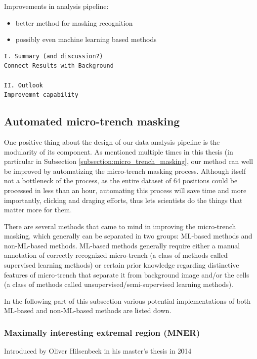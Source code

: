 \documentclass[pdftex,12pt,a4paper]{report}
\begin{document}
Improvements in analysis pipeline:

\begin{itemize}
\item better method for masking recognition
\item possibly even machine learning based methods
\end{itemize}

\begin{verbatim}
I. Summary (and discussion?)
Connect Results with Background

II. Outlook
Improvemnt capability
\end{verbatim}

\subsection{Automated micro-trench masking}

One positive thing about the design of our data analysis pipeline is the modularity of its component. As mentioned multiple times in this thesis (in particular in Subsection \ref{subsection:micro_trench_masking}, our method can well be improved by automatizing the micro-trench masking process. Although itself not a bottleneck of the process, as the entire dataset of 64 positions could be processed in less than an hour, automating this process will save time and more importantly, clicking and draging efforts, thus lets scientists do the things that matter more for them.

There are several methods that came to mind in improving the micro-trench masking, which generally can be separated in two groups: ML-based methods and non-ML-based methods. ML-based methods generally require either a manual annotation of correctly recognized micro-trench (a class of methods called supervised learning methods) or certain prior knowledge regarding distinctive features of micro-trench that separate it from background image and/or the cells (a class of methods called unsupervised/semi-supervised learning methods).

In the following part of this subsection various potential implementations of both ML-based and non-ML-based methods are listed down.

\subsubsection*{Maximally interesting extremal region (MNER)}

Introduced by Oliver Hilsenbeck in his master's thesis in 2014 \cite{hilsenbeck2014maximally} %
\end{document}
